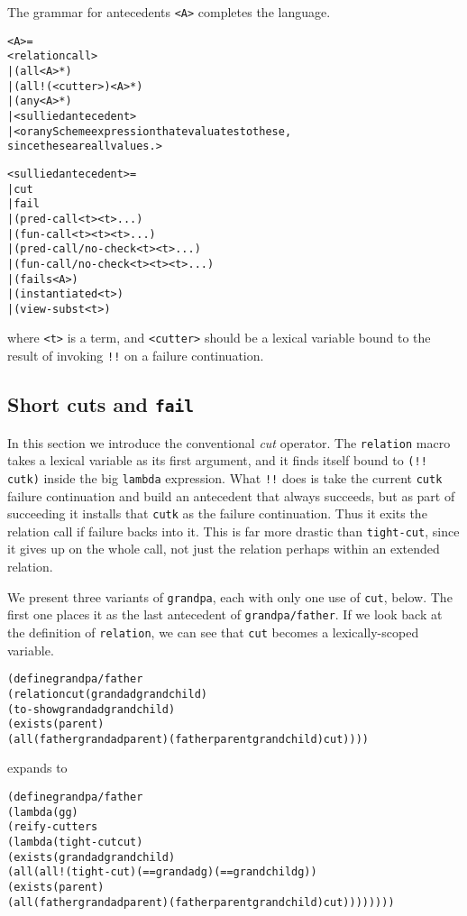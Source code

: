 The grammar for antecedents \texttt{<A>} completes the language.
\begin{alltt}
<A> = 
     <relation call> 
   | (all <A>*)
   | (all! (<cutter>) <A>*)
   | (any <A>*) 
   | <sullied antecedent>
   | <or any Scheme expression that evaluates to these,
       since these are all values.>

<sullied antecedent> = 
   | cut
   | fail
   | (pred-call <t> <t> ...)
   | (fun-call <t> <t> <t> ...)
   | (pred-call/no-check <t> <t> ...)
   | (fun-call/no-check <t> <t> <t> ...)
   | (fails <A>)
   | (instantiated <t>)
   | (view-subst <t>)
\end{alltt}

\noindent
where \texttt{<t>} is a term, and \texttt{<cutter>} should be a
lexical variable bound to the result of invoking \texttt{!!}
on a failure continuation.

\subsection{Short cuts and \texttt{fail}}

In this section we introduce the conventional \emph{cut} operator.
The \texttt{relation} macro takes a lexical variable as its first
argument, and it finds itself bound to \texttt{(!! cutk)} inside the
big \texttt{lambda} expression.  What \texttt{!!} does is take the
current \texttt{cutk} failure continuation and build an antecedent
that always succeeds, but as part of succeeding it installs that
\texttt{cutk} as the failure continuation.  Thus it exits the relation
call if failure backs into it.  This is far more drastic than
\texttt{tight-cut}, since it gives up on the whole call, not just the
relation perhaps within an extended relation.

We present three variants of \texttt{grandpa}, each with only one use
of \texttt{cut}, below. The first one places it as the last
antecedent of \texttt{grandpa/father}.  If we look
back at the definition of \texttt{relation}, we can see that
\texttt{cut} becomes a lexically-scoped variable.

\begin{alltt}
(define grandpa/father
  (relation cut (grandad grandchild)
    (to-show grandad grandchild)
    (exists (parent)
      (all (father grandad parent) (father parent grandchild) cut))))
\end{alltt}

\noindent
expands to

\begin{alltt}
(define grandpa/father
  (lambda (g g)
    (reify-cutters
      (lambda (tight-cut cut)
        (exists (grandad grandchild)
          (all (all! (tight-cut) (== grandad g) (== grandchild g))
            (exists (parent)
              (all (father grandad parent) (father parent grandchild) cut))))))))
\end{alltt}

